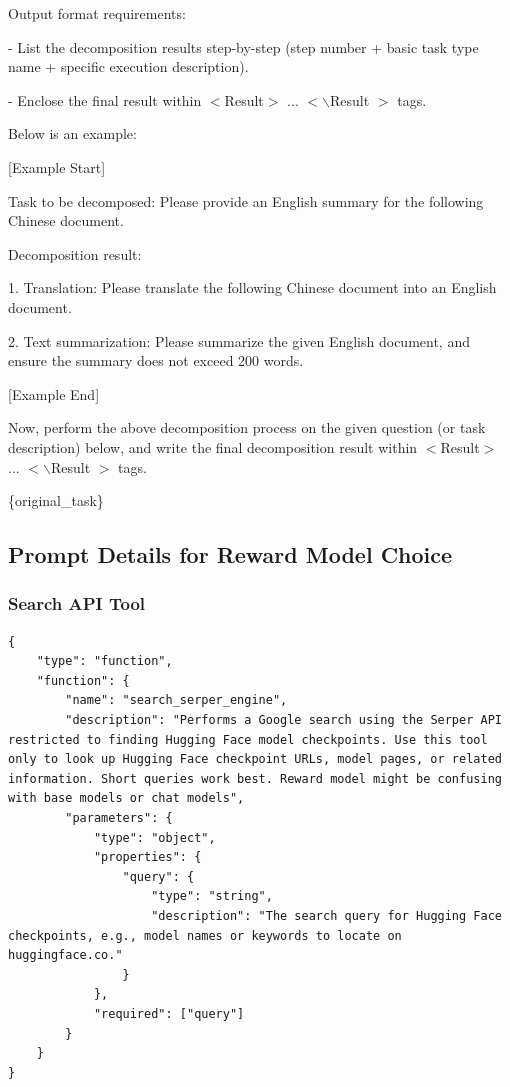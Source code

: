 \begin{tcolorbox}[title = {Task\_Decomposition\_Prompt}, breakable, colframe=blue!50!black, colback=blue!10]
Output format requirements:

- List the decomposition results step-by-step (step number + basic task type name + specific execution description). 

- Enclose the final result within $<$Result$>$ ... $<\backslash$Result $>$  tags.  

Below is an example:  


[Example Start]  


Task to be decomposed: Please provide an English summary for the following Chinese document.

Decomposition result:  

1. Translation: Please translate the following Chinese document into an English document.  

2. Text summarization: Please summarize the given English document, and ensure the summary does not exceed 200 words.  

[Example End]  

Now, perform the above decomposition process on the given question (or task description) below, and write the final decomposition result within $<$Result$>$ ... $<\backslash$Result $>$  tags.

\{original\_task\}

\end{tcolorbox}





\subsection{Prompt Details for Reward Model Choice}

\subsubsection{Search API Tool} \label{apd:tool_snippet}

\begin{lstlisting}[style=mypython]
{
    "type": "function",
    "function": {
        "name": "search_serper_engine",
        "description": "Performs a Google search using the Serper API restricted to finding Hugging Face model checkpoints. Use this tool only to look up Hugging Face checkpoint URLs, model pages, or related information. Short queries work best. Reward model might be confusing with base models or chat models",
        "parameters": {
            "type": "object",
            "properties": {
                "query": {
                    "type": "string",
                    "description": "The search query for Hugging Face checkpoints, e.g., model names or keywords to locate on huggingface.co."
                }
            },
            "required": ["query"]
        }
    }
}
\end{lstlisting}



